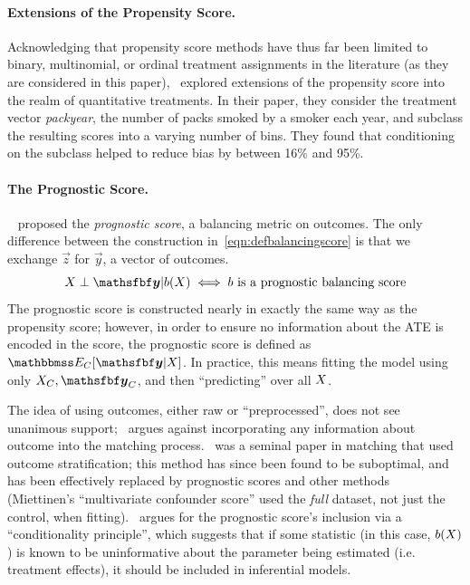 \documentclass[11pt]{extarticle}
\begin{document}
\paragraph{Extensions of the Propensity Score.} Acknowledging that propensity score methods have thus far been limited to binary, multinomial, or ordinal treatment assignments in the literature (as they are considered in this paper),~\textcite{imai_causal_2004} explored extensions of the propensity score into the realm of quantitative treatments. In their paper, they consider the treatment vector \emph{packyear}, the number of packs smoked by a smoker each year, and subclass the resulting scores into a varying number of bins. They found that conditioning on the subclass helped to reduce bias by between 16\% and 95\%.

\paragraph{The Prognostic Score.}~\textcite{hansen_prognostic_2008} proposed the \emph{prognostic score}, a balancing metric on outcomes. The only difference between the construction in~\eqref{eqn:defbalancingscore} is that we exchange $\vec{z}$ for $\vec{y}$, a vector of outcomes.
\begin{equation}
  \mat{X} \perp \vec{y} | b(\mat{X}) \iff b \text{ is a prognostic balancing score} \label{eqn:prognosticscoredef}
\end{equation}
The prognostic score is constructed nearly in exactly the same way as the propensity score; however, in order to ensure no information about the ATE is encoded in the score, the prognostic score is defined as $\mathbbmss E_C [\vec{y} | \mat{X} ]$. In practice, this means fitting the model using only $\mat{X}_C, \vec{y}_C$, and then ``predicting'' over all $X$.

The idea of using outcomes, either raw or ``preprocessed'', does not see unanimous support;~\textcite{garrido_methods_2014} argues against incorporating any information about outcome into the matching process.~\textcite{miettinen_stratification_1976} was a seminal paper in matching that used outcome stratification; this method has since been found to be suboptimal, and has been effectively replaced by prognostic scores and other methods~\parencite{hansen_bias_2006} (Miettinen's ``multivariate confounder score'' used the \emph{full} dataset, not just the control, when fitting).~\textcite{hansen_bias_2006} argues for the prognostic score's inclusion via a ``conditionality principle'', which suggests that if some statistic (in this case, $b(X)$) is known to be uninformative about the parameter being estimated (i.e. treatment effects), it should be included in inferential models.
\end{document}
